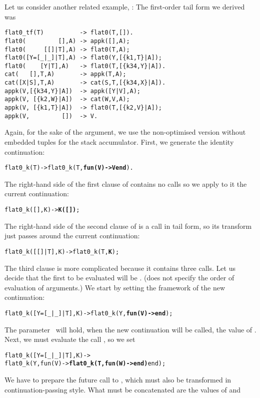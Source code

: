 Let us consider another related example, :
 The first\hyp{}order tail form we derived
was
\begin{verbatim}
flat0_tf(T)          -> flat0(T,[]).
flat0(         [],A) -> appk([],A);
flat0(     [[]|T],A) -> flat0(T,A);
flat0([Y=[_|_]|T],A) -> flat0(Y,[{k1,T}|A]);
flat0(    [Y|T],A)   -> flat0(T,[{k34,Y}|A]).
cat(   [],T,A)       -> appk(T,A);
cat([X|S],T,A)       -> cat(S,T,[{k34,X}|A]).
appk(V,[{k34,Y}|A])  -> appk([Y|V],A);
appk(V, [{k2,W}|A])  -> cat(W,V,A);
appk(V, [{k1,T}|A])  -> flat0(T,[{k2,V}|A]);
appk(V,         [])  -> V.
\end{verbatim}
Again, for the sake of the argument, we use the non\hyp{}optimised
version without embedded tuples for the stack accumulator. First, we
generate the identity continuation:
\begin{alltt}
flat0\_k(T) -> flat0\_k(T,\textbf{fun(V) -> V end}).
\end{alltt}
The right\hyp{}hand side of the first clause of 
contains no calls so we apply to it the current continuation:
\begin{alltt}
flat0\_k(         [],K) -> \textbf{K([])};
\end{alltt}
The right\hyp{}hand side of the second clause of  is a
call in tail form, so its transform just passes around the current
continuation:
\begin{alltt}
flat0\_k(     [[]|T],K) -> flat0\_k(T,\textbf{K});
\end{alltt}
The third clause is more complicated because it contains three
calls. Let us decide that the first to be evaluated will be
. (\Erlang does not specify the order of evaluation
of arguments.) We start by setting the framework of the new
continuation:
\begin{alltt}
flat0\_k([Y=[\_|\_]|T],K) -> flat0\_k(Y,\textbf{fun(V) ->  end});
\end{alltt}
The parameter~ will hold, when the new continuation will be
called, the value of . Next, we must evaluate the
call , so we set
\begin{alltt}
flat0\_k([Y=[\_|\_]|T],K) ->
  flat0\_k(Y,fun(V) -> \textbf{flat0\_k(T,fun(W) ->  end)} end);
\end{alltt}
We have to prepare the future call to , which must also
be transformed in continuation\hyp{}passing style. What must be
concatenated are the values of  and
